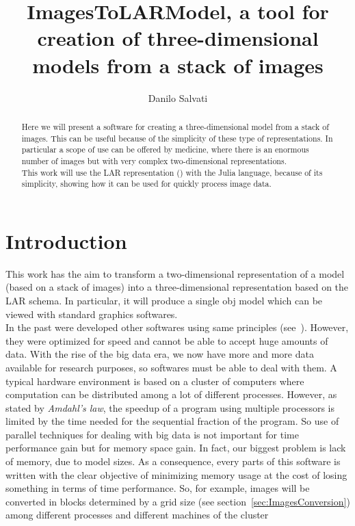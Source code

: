 \documentclass[11pt,oneside]{article}	%
\title{ImagesToLARModel, a tool for creation of three-dimensional models from a stack of images}
\author{Danilo Salvati}
\begin{document}
\maketitle

\begin{abstract}
Here we will present a software for creating a three-dimensional model from a stack of images. This can be useful because of the simplicity of these type of representations. In particular a scope of use can be offered by medicine, where there is an enormous number of images but with very complex two-dimensional representations.\\

This work will use the LAR representation (\cite{cclar-proj:2013:00}) with the Julia language, because of its simplicity, showing how it can be used for quickly process image data.

\end{abstract}

\newpage
\tableofcontents
\newpage

\section{Introduction}\label{sec:intro}

This work has the aim to transform a two-dimensional representation of a model (based on a stack of images) into a three-dimensional representation based on the LAR schema. In particular, it will produce a single obj model which can be viewed with standard graphics softwares.\\

In the past were developed other softwares using same principles (see~\cite{paodcvjcadanda2015}). However, they were optimized for speed and cannot be able to accept huge amounts of data. With the rise of the big data era, we now have more and more data available for research purposes, so softwares must be able to deal with them. A typical hardware environment is based on a cluster of computers where computation can be distributed among a lot of different processes. However, as stated by \textit{Amdahl's law}, the speedup of a program using multiple processors is limited by the time needed for the sequential fraction of the program. So use of parallel techniques for dealing with big data is not important for time performance gain but for memory space gain. In fact, our biggest problem is lack of memory, due to model sizes. As a consequence, every parts of this software is written with the clear objective of minimizing memory usage at the cost of losing something in terms of time performance. So, for example, images will be converted in blocks determined by a grid size (see section~\ref{sec:ImagesConversion}) among different processes and different machines of the cluster
\end{document}
